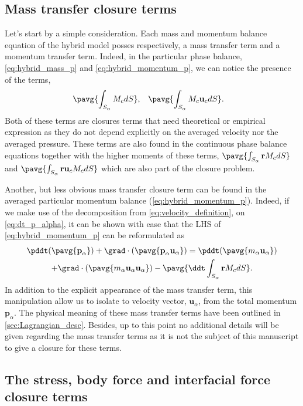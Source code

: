\subsection{Mass transfer closure terms}

Let's start by a simple consideration. 
Each mass and momentum balance equation of the hybrid model posses respectively, a mass transfer term and a momentum transfer term. 
Indeed, in the particular phase balance, \ref{eq:hybrid_mass_p} and \ref{eq:hybrid_momentum_p}, we can notice the presence of the terms,
\begin{equation*}
    \pavg{\int_{S_\alpha} M_c dS},  \;\;\;
    \pavg{\int_{S_\alpha} M_c \textbf{u}_c dS}.  \;\;\;
\end{equation*}
Both of these terms are closures terms that need theoretical or empirical expression as they do not depend explicitly on the averaged velocity nor the averaged pressure. 
These terms are also found in the continuous phase balance equations together with the higher moments of these terms, $\pavg{\int_{S_\alpha} \textbf{r} M_c dS}$ and $\pavg{\int_{S_\alpha} \textbf{r}  \textbf{u}_c M_c dS}$ which are also part of the closure problem. 

Another, but less obvious mass transfer closure term can be found in the averaged particular momentum balance (\ref{eq:hybrid_momentum_p}). 
Indeed, if we make use of the decomposition from \ref{eq:velocity_definition}, on \ref{eq:dt_p_alpha},  it  can be shown with ease that the LHS of \ref{eq:hybrid_momentum_p} can be reformulated as  
\begin{multline}
    \pddt   (\pavg{\textbf{p}_\alpha})
    + \grad \cdot (\pavg{\textbf{p}_\alpha \textbf{u}_\alpha}) 
    = \pddt (\pavg{m_\alpha\textbf{u}_\alpha}) \\
    + \grad \cdot (\pavg{m_\alpha \textbf{u}_\alpha \textbf{u}_\alpha})
    - \pavg{\ddt \int_{S_\alpha} \textbf{r} M_c dS}.
    \label{eq:advection_term_eq}
\end{multline}
In addition to the explicit appearance of the mass transfer term, this manipulation allow us to isolate to velocity vector, $\textbf{u}_\alpha$, from the total momentum $\textbf{p}_\alpha$. 
The physical meaning of these mass transfer terms have been outlined in \ref{sec:Lagrangian_desc}.
Besides, up to this point no additional details will be  given regarding the mass transfer terms as it is not the subject  of this manuscript to give a closure for these terms. 

\subsection{The stress, body force and interfacial force closure terms}

